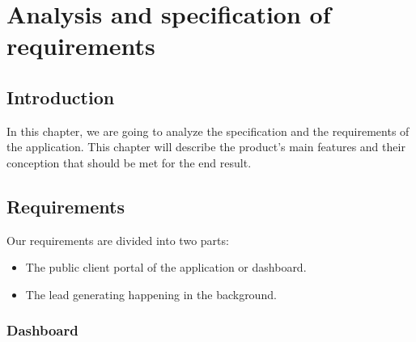 \chapter{Analysis and specification of requirements}
\newpage

\setcounter{secnumdepth}{0} %
\section{Introduction}
In this chapter, we are going to analyze the specification and the requirements of the application.
This chapter will describe the product's main features and their conception that should be met for the end result.

\setcounter{secnumdepth}{2} %
\section{Requirements}
Our requirements are divided into two parts:
\begin{itemize}
	\item The public client portal of the application or dashboard.
	\item The lead generating happening in the background.
\end{itemize}

\subsection{Dashboard}

